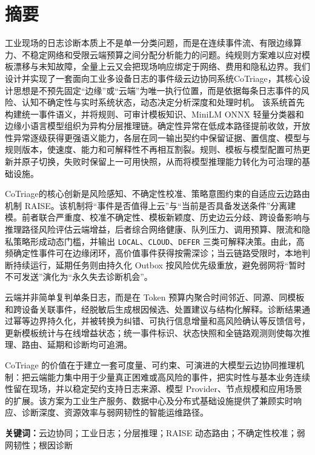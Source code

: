 \chapter*{摘要}

工业现场的日志诊断本质上不是单一分类问题，而是在连续事件流、有限边缘算力、不稳定网络和受限云端预算之间分配分析能力的问题。纯规则方案难以应对模板漂移与未知故障，全量上云又会把现场响应绑定于网络、费用和隐私边界。我们设计并实现了一套面向工业多设备日志的事件级云边协同系统CoTriage，其核心设计思想是不预先固定“边缘”或“云端”为唯一执行位置，而是依据每条日志事件的风险、认知不确定性与实时系统状态，动态决定分析深度和处理时机。
该系统首先构建统一事件语义，并将规则、可审计模板知识、MiniLM ONNX 轻量分类器和边缘小语言模型组织为异构分层推理链。确定性异常在低成本路径提前收敛，开放性异常逐级获得更强语义能力，各层在同一输出契约中保留证据、置信度、模型与规则版本，使速度、能力和可解释性不再相互割裂。规则、模板与模型配置可热更新并原子切换，失败时保留上一可用快照，从而将模型推理能力转化为可治理的基础设施。

CoTriage的核心创新是风险感知、不确定性校准、策略意图约束的自适应云边路由机制 RAISE。该机制将“事件是否值得上云”与“当前是否具备发送条件”分离建模。前者联合严重度、校准不确定性、模板新颖度、历史边云分歧、跨设备影响与推理路径风险评估云端增益，后者综合网络健康、队列压力、调用预算、限流和隐私策略形成动态门槛，并输出 \texttt{LOCAL}、\texttt{CLOUD}、\texttt{DEFER} 三类可解释决策。由此，高频确定性事件可在边缘闭环，高价值事件获得按需深诊；当云链路受限时，本地判断持续运行，延期任务则由持久化 Outbox 按风险优先级重放，避免弱网将“暂时不可发送”演化为“永久失去诊断机会”。

云端并非简单复判单条日志，而是在 Token 预算内聚合时间邻近、同源、同模板和跨设备关联事件，经脱敏后生成根因候选、处置建议与结构化解释。诊断结果通过幂等边界持久化，并被转换为纠错、可执行信息增量和高风险确认等反馈信号，更新模板统计与在线增益状态；统一事件标识、状态快照和全链路观测则使每次推理、路由、延期和诊断均可追溯。

CoTriage 的价值在于建立一套可度量、可约束、可演进的大模型云边协同推理机制：把云端能力集中用于少量真正困难或高风险的事件，把实时性与基本业务连续性留在现场，并以稳定契约支持日志来源、模型 Provider、节点规模和应用场景的扩展。该方案为工业生产服务、数据中心及分布式基础设施提供了兼顾实时响应、诊断深度、资源效率与弱网韧性的智能运维路径。

\noindent\textbf{关键词：}云边协同；工业日志；分层推理；RAISE 动态路由；不确定性校准；弱网韧性；根因诊断
\clearpage
